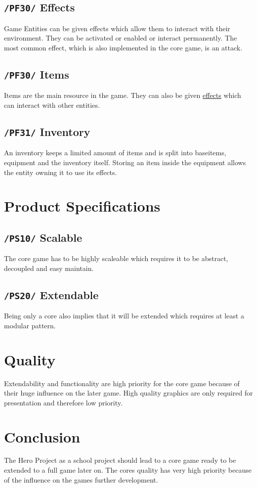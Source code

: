 \documentclass[11pt]{article}
\begin{document}
\subsection{\texttt{/PF30/} Effects}\label{subsec:pf30effects}
Game Entities can be given effects which allow them to interact with their environment.
They can be activated or enabled or interact permanently.
The most common effect, which is also implemented in the core game, is an attack.
\subsection{\texttt{/PF30/} Items}\label{subsec:pf40items}
Items are the main resource in the game. They can also be given \hyperref[subsec:pf30effects]{effects} which can interact with other entities.
\subsection{\texttt{/PF31/} Inventory}\label{subsec:pf41inventory}
An inventory keeps a limited amount of items and is split into baseitems, equipment and the inventory itself.
Storing an item inside the equipment allows the entity owning it to use its effects.

\section{Product Specifications}\label{sec:ps}
\subsection{\texttt{/PS10/} Scalable}
The core game has to be highly scaleable which requires it to be abstract, decoupled and easy maintain.
\subsection{\texttt{/PS20/} Extendable}
Being only a core also implies that it will be extended which requires at least a modular pattern.

\section{Quality}
Extendability and functionality are high priority for the core game because of their huge influence on the later game.
High quality graphics are only required for presentation and therefore low priority.

\section{Conclusion}
The Hero Project as a school project should lead to a core game ready to be extended to a full game later on.
The cores quality has very high priority because of the influence on the games further development.
\end{document}
